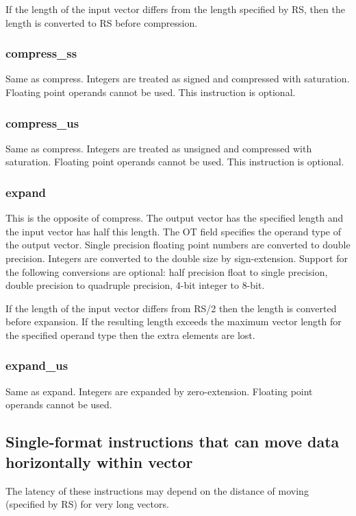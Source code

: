 \documentclass[forwardcom.tex]{subfiles}
\begin{document}
If the length of the input vector differs from the length specified by RS, then the length is converted to RS before compression.

\subsubsection{compress\_ss}
Same as compress. Integers are treated as signed and compressed with saturation. Floating point operands cannot be used. This instruction is optional.

\subsubsection{compress\_us}
Same as compress. Integers are treated as unsigned and compressed with saturation. Floating point operands cannot be used. This instruction is optional.

\subsubsection{expand}
This is the opposite of compress. The output vector has the specified length and the input vector has half this length. The OT field specifies the operand type of the output vector. Single precision floating point numbers are converted to double precision. Integers are converted to the double size by sign-extension. Support for the following conversions are optional: half precision float to single precision, double precision to quadruple precision, 4-bit integer to 8-bit.
\vspace{2mm}

If the length of the input vector differs from RS/2 then the length is converted before expansion. If the resulting length exceeds the maximum vector length for the specified operand type then the extra elements are lost.

\subsubsection{expand\_us}
Same as expand. Integers are expanded by zero-extension. Floating point operands cannot be used. 

\vspace{2mm}
\subsection{Single-format instructions that can move data horizontally within vector}
The latency of these instructions may depend on the distance of moving (specified by RS) for very long vectors.
\end{document}
